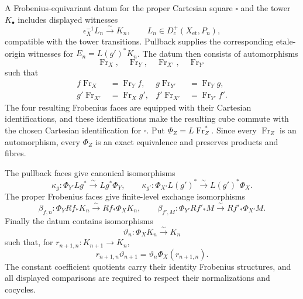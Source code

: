 \begin{definition}
\label{def:weil-pbc-frobenius-tower-datum}
A Frobenius-equivariant datum for the proper Cartesian square $\square$ and
the tower $K_\bullet$ includes displayed witnesses
\[
 \epsilon_X^{-1}L_n\xrightarrow{\sim}K_n,
 \qquad L_n\in D_c^+(X_{\mathrm{et}},P_n),
\]
compatible with the tower transitions.  Pullback supplies the corresponding
etale-origin witnesses for $E_n=L(g')^*K_n$.  The datum then consists of
automorphisms
\[
 \operatorname{Fr}_X,\quad \operatorname{Fr}_Y,\quad
 \operatorname{Fr}_{X'},\quad \operatorname{Fr}_{Y'}
\]
such that
\[
\begin{aligned}
 f\operatorname{Fr}_X&=\operatorname{Fr}_Yf,&
 g\operatorname{Fr}_{Y'}&=\operatorname{Fr}_Yg,\\
 g'\operatorname{Fr}_{X'}&=\operatorname{Fr}_Xg',&
 f'\operatorname{Fr}_{X'}&=\operatorname{Fr}_{Y'}f'.
\end{aligned}
\]
The four resulting Frobenius faces are equipped with their Cartesian
identifications, and these identifications make the resulting cube commute
with the chosen Cartesian identification for $\square$.  Put
$\Phi_Z=L\operatorname{Fr}_Z^*$.  Since every $\operatorname{Fr}_Z$ is an
automorphism, every $\Phi_Z$ is an exact equivalence and preserves products
and fibres.

The pullback faces give canonical isomorphisms
\[
 \kappa_g:\Phi_{Y'}Lg^*\xrightarrow{\sim}Lg^*\Phi_Y,
 \qquad
 \kappa_{g'}:\Phi_{X'}L(g')^*\xrightarrow{\sim}L(g')^*\Phi_X.
\]
The proper Frobenius faces give finite-level exchange isomorphisms
\[
 \beta_{f,n}:\Phi_YRf_*K_n\xrightarrow{\sim}Rf_*\Phi_XK_n,
 \qquad
 \beta_{f',M}:\Phi_{Y'}Rf'_*M\xrightarrow{\sim}Rf'_*\Phi_{X'}M.
\]
Finally the datum contains isomorphisms
\[
 \vartheta_n:\Phi_XK_n\xrightarrow{\sim}K_n
\]
such that, for $r_{n+1,n}:K_{n+1}\to K_n$,
\[
 r_{n+1,n}\vartheta_{n+1}
 =\vartheta_n\Phi_X(r_{n+1,n}).
\]
The constant coefficient quotients carry their identity Frobenius
structures, and all displayed comparisons are required to respect their
normalizations and cocycles.
\end{definition}


